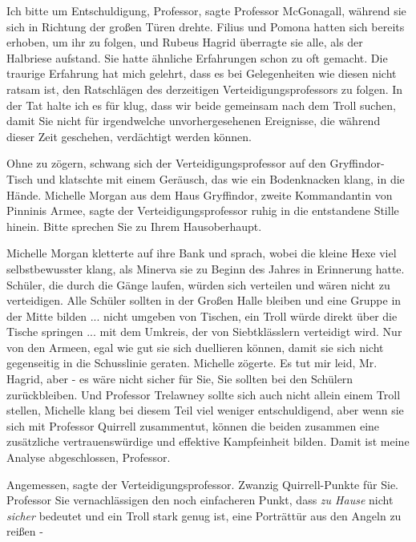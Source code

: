 \glqq{}Ich bitte um Entschuldigung, Professor\grqq{}, sagte Professor McGonagall,
während sie sich in Richtung der großen Türen drehte. Filius und Pomona hatten
sich bereits erhoben, um ihr zu folgen, und Rubeus Hagrid überragte sie alle,
als der Halbriese aufstand. Sie hatte ähnliche Erfahrungen schon zu oft gemacht.
\glqq{}Die traurige Erfahrung hat mich gelehrt, dass es bei Gelegenheiten wie
diesen nicht ratsam ist, den Ratschlägen des derzeitigen Verteidigungsprofessors
zu folgen. In der Tat halte ich es für klug, dass wir beide gemeinsam nach dem
Troll suchen, damit Sie nicht für irgendwelche unvorhergesehenen Ereignisse, die
während dieser Zeit geschehen, verdächtigt werden können.\grqq{}

Ohne zu zögern, schwang sich der Verteidigungsprofessor auf den Gryffindor-Tisch
und klatschte mit einem Geräusch, das wie ein Bodenknacken klang, in die Hände.
\glqq{}Michelle Morgan aus dem Haus Gryffindor, zweite Kommandantin von Pinninis
Armee\grqq{}, sagte der Verteidigungsprofessor ruhig in die entstandene Stille
hinein. \glqq{}Bitte sprechen Sie zu Ihrem Hausoberhaupt.\grqq{}

Michelle Morgan kletterte auf ihre Bank und sprach, wobei die kleine Hexe viel
selbstbewusster klang, als Minerva sie zu Beginn des Jahres in Erinnerung hatte.
\glqq{}Schüler, die durch die Gänge laufen, würden sich verteilen und wären nicht
zu verteidigen. Alle Schüler sollten in der Großen Halle bleiben und eine Gruppe
in der Mitte bilden ... nicht umgeben von Tischen, ein Troll würde direkt über
die Tische springen ... mit dem Umkreis, der von Siebtklässlern verteidigt wird.
Nur von den Armeen, egal wie gut sie sich duellieren können, damit sie sich
nicht gegenseitig in die Schusslinie geraten.\grqq{} Michelle zögerte. \glqq{}Es
tut mir leid, Mr. Hagrid, aber - es wäre nicht sicher für Sie, Sie sollten bei
den Schülern zurückbleiben. Und Professor Trelawney sollte sich auch nicht
allein einem Troll stellen\grqq{}, Michelle klang bei diesem Teil viel weniger
entschuldigend, \glqq{}aber wenn sie sich mit Professor Quirrell zusammentut,
können die beiden zusammen eine zusätzliche vertrauenswürdige und effektive
Kampfeinheit bilden. Damit ist meine Analyse abgeschlossen, Professor.\grqq{}

\glqq{}Angemessen\grqq{}, sagte der Verteidigungsprofessor. \glqq{}Zwanzig
Quirrell-Punkte für Sie. Professor Sie vernachlässigen den noch einfacheren
Punkt, dass \emph{zu Hause} nicht \emph{sicher} bedeutet und ein Troll stark
genug ist, eine Porträttür aus den Angeln zu reißen -\grqq{}

